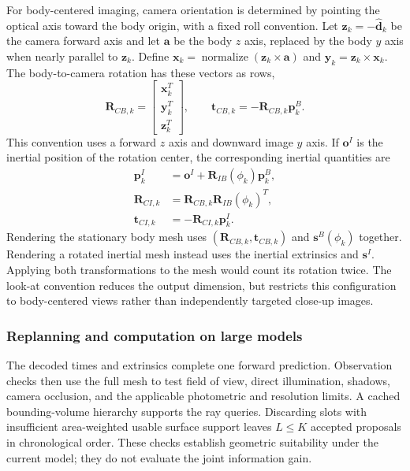 For body-centered imaging, camera orientation is determined by pointing the optical axis toward the body origin, with a fixed roll convention. Let $\mathbf z_k=-\hat{\mathbf d}_k$ be the camera forward axis and let $\mathbf a$ be the body $z$ axis, replaced by the body $y$ axis when nearly parallel to $\mathbf z_k$. Define $\mathbf x_k=\operatorname{normalize}(\mathbf z_k\times\mathbf a)$ and $\mathbf y_k=\mathbf z_k\times\mathbf x_k$. The body-to-camera rotation has these vectors as rows,
\begin{equation}
    \mathbf R_{CB,k}=\begin{bmatrix}
        \mathbf x_k^T\\ \mathbf y_k^T\\ \mathbf z_k^T
    \end{bmatrix},
    \qquad \mathbf t_{CB,k}=-\mathbf R_{CB,k}\mathbf p_k^B.
    \label{eq:planner-body-extrinsics}
\end{equation}
This convention uses a forward $z$ axis and downward image $y$ axis. If $\mathbf o^I$ is the inertial position of the rotation center, the corresponding inertial quantities are
\begin{equation}
    \begin{aligned}
        \mathbf p_k^I&=\mathbf o^I+\mathbf R_{IB}(\phi_k)\mathbf p_k^B,\\
        \mathbf R_{CI,k}&=\mathbf R_{CB,k}\mathbf R_{IB}(\phi_k)^T,\\
        \mathbf t_{CI,k}&=-\mathbf R_{CI,k}\mathbf p_k^I.
    \end{aligned}
    \label{eq:planner-inertial-extrinsics}
\end{equation}
Rendering the stationary body mesh uses $(\mathbf R_{CB,k},\mathbf t_{CB,k})$ and $\mathbf s^B(\phi_k)$ together. Rendering a rotated inertial mesh instead uses the inertial extrinsics and $\mathbf s^I$. Applying both transformations to the mesh would count its rotation twice. The look-at convention reduces the output dimension, but restricts this configuration to body-centered views rather than independently targeted close-up images.

\subsubsection{Replanning and computation on large models}
\label{subsubsec:planner-execution}

The decoded times and extrinsics complete one forward prediction. Observation checks then use the full mesh to test field of view, direct illumination, shadows, camera occlusion, and the applicable photometric and resolution limits. A cached bounding-volume hierarchy supports the ray queries. Discarding slots with insufficient area-weighted usable surface support leaves $L\leq K$ accepted proposals in chronological order. These checks establish geometric suitability under the current model; they do not evaluate the joint information gain.

